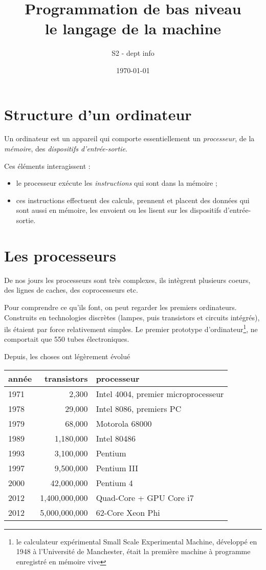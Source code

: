 \documentclass[10pt]{article}
\title{Programmation de bas niveau \\
le langage de la machine}
\author{S2 - dept info}
\date{\today}
\begin{document}
\maketitle

\tableofcontents

\section{Structure d'un ordinateur}

Un ordinateur est un appareil qui comporte essentiellement
un \emph{processeur},
de la \emph{mémoire}, des \emph{dispositifs d'entrée-sortie}.

Ces éléments interagissent : 
\begin{itemize}
\item le processeur exécute les \emph{instructions}
qui sont dans la mémoire ;
\item ces instructions effectuent des calculs, prennent et placent des
  données qui sont aussi en mémoire, les envoient ou les lisent sur
  les dispositifs d'entrée-sortie.
\end{itemize}

\section{Les processeurs}

De nos jours les processeurs sont très complexes, ils intègrent
plusieurs coeurs, des lignes de caches, des coprocesseurs etc.

Pour comprendre ce qu'ils font, on peut regarder les premiers
ordinateurs.  Construits en technologies discrètes (lampes, puis
transistors et circuits intégrés), ils étaient par force relativement
simples. Le premier prototype d'ordinateur\footnote{le calculateur
  expérimental Small Scale Experimental Machine, développé en 1948 à
  l'Université de Manchester, était la première machine à programme enregistré en mémoire vive}, ne comportait que 550 tubes
électroniques.

Depuis, les choses ont légèrement évolué

\begin{center}
\begin{tabular}{|l|r|l|}
\hline
année &  transistors & processeur\\
\hline
1971 & 2,300 & Intel 4004, premier microprocesseur \\
1978 & 29,000 & Intel 8086, premiers PC \\
1979 & 68,000 & Motorola 68000 \\
1989 &	1,180,000 & Intel 80486 \\
1993 & 	3,100,000 & Pentium \\
1997 & 	9,500,000  & Pentium III \\
2000 & 42,000,000 & Pentium 4 \\
2012 & 1,400,000,000 & Quad-Core + GPU Core i7 \\
2012 & 5,000,000,000  & 62-Core Xeon Phi \\
\hline
\end{tabular}
\end{center}
\end{document}

